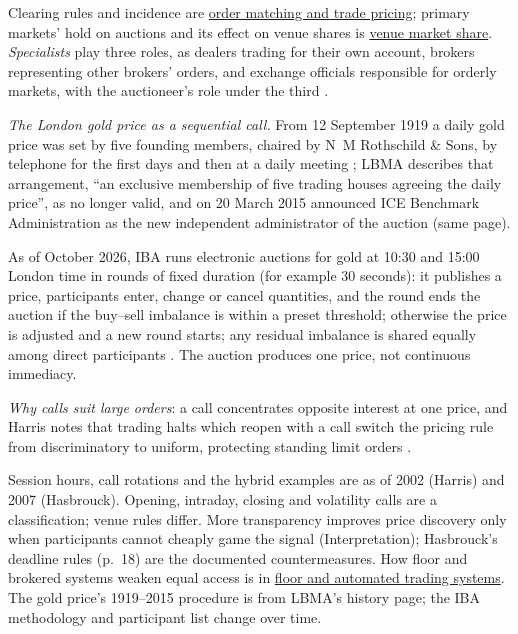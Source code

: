 \begin{qfdefinition}
Clearing rules and incidence are \hyperref[mech:order-matching-pricing]{order matching and trade pricing}; primary markets' hold on auctions and its effect on venue shares is \hyperref[meth:venue-market-share]{venue market share}. \emph{Specialists} play three roles, as dealers trading for their own account, brokers representing other brokers' orders, and exchange officials responsible for orderly markets, with the auctioneer's role under the third \citep[chap.~24, sec.~24.1, p.~496; secs.~24.2--24.4, pp.~496--501]{alpha-harris}.

 \emph{The London gold price as a sequential call.} From 12 September 1919 a daily gold price was set by five founding members, chaired by N~M Rothschild \& Sons, by telephone for the first days and then at a daily meeting \citep[web page]{lbma-gold-centenary}; LBMA describes that arrangement, ``an exclusive membership of five trading houses agreeing the daily price'', as no longer valid, and on 20 March 2015 announced ICE Benchmark Administration as the new independent administrator of the auction (same page).

As of October 2026, IBA runs electronic auctions for gold at 10:30 and 15:00 London time in rounds of fixed duration (for example 30 seconds): it publishes a price, participants enter, change or cancel quantities, and the round ends the auction if the buy--sell imbalance is within a preset threshold; otherwise the price is adjusted and a new round starts; any residual imbalance is shared equally among direct participants \citep[web page]{iba-precious-metals-auctions}. The auction produces one price, not continuous immediacy.

\emph{Why calls suit large orders}: a call concentrates opposite interest at one price, and Harris notes that trading halts which reopen with a call switch the pricing rule from discriminatory to uniform, protecting standing limit orders \citep[chap.~28, pp.~572--573]{alpha-harris}.

 Session hours, call rotations and the hybrid examples are as of 2002 (Harris) and 2007 (Hasbrouck). Opening, intraday, closing and volatility calls are a classification; venue rules differ. More transparency improves price discovery only when participants cannot cheaply game the signal (Interpretation); Hasbrouck's deadline rules (p.~18) are the documented countermeasures. How floor and brokered systems weaken equal access is in \hyperref[def:floor-automated-trading-systems]{floor and automated trading systems}. The gold price's 1919--2015 procedure is from LBMA's history page; the IBA methodology and participant list change over time.


\end{qfdefinition}
